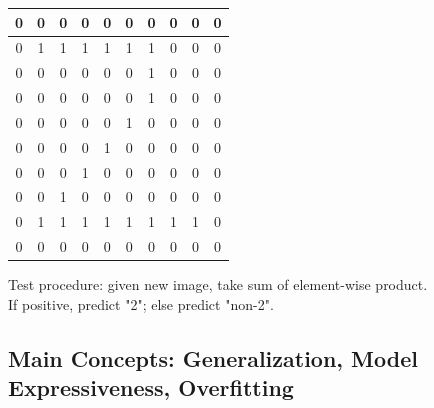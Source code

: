 \documentclass{beamer}
\begin{document}
\begin{frame}
\begin{center}
{\begin{tabular}{|c|c|c|c|c|c|c|c|c|c|}
\hline
0 & 0 & 0 & 0 & 0 & 0 & 0 & 0 & 0 & 0 \\
\hline
0 & 1 & 1 & 1 & 1 & 1 & 1 & 0 & 0 & 0 \\
\hline
0 & 0 & 0 & 0 & 0 & 0 & 1 & 0 & 0 & 0 \\
\hline
0 & 0 & 0 & 0 & 0 & 0 & 1 & 0 & 0 & 0 \\
\hline
0 & 0 & 0 & 0 & 0 & 1 & 0 & 0 & 0 & 0 \\
\hline
0 & 0 & 0 & 0 & 1 & 0 & 0 & 0 & 0 & 0 \\
\hline
0 & 0 & 0 & 1 & 0 & 0 & 0 & 0 & 0 & 0 \\
\hline
0 & 0 & 1 & 0 & 0 & 0 & 0 & 0 & 0 & 0 \\
\hline
0 & 1 & 1 & 1 & 1 & 1 & 1 & 1 & 1 & 0 \\
\hline
0 & 0 & 0 & 0 & 0 & 0 & 0 & 0 & 0 & 0 \\
\hline
\end{tabular}}
\end{center}
\pause
Test procedure: given new image, take sum of element-wise product.\\If positive, predict "2"; else predict "non-2".
\end{frame}

\subsection[Main Concepts]{Main Concepts: Generalization, Model Expressiveness, Overfitting}
\end{document}
